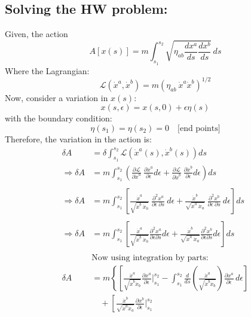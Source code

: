 \documentclass[14pt]{article} %
\begin{document}
\begin{framed}
\vspace{-0.5cm}
\subsection*{Solving the HW problem:}
Given, the action
\[
A[x(s)] = m \int_{s_1}^{s_2} \sqrt{\eta_{ab} \frac{dx^a}{ds} \frac{dx^b}{ds}} \, ds
\]
Where the Lagrangian:
\[
\mathcal{L}(\dot{x}^a, \dot{x}^b) = m\left( \eta_{ab}~\dot{x}^a\dot{x}^b \right)^{1/2}
\]
\noindent
Now, consider a variation in $x(s)$:
\[
x(s,\epsilon) = x(s,0) + \epsilon\eta(s)
\]
with the boundary condition:
\[
\eta(s_1) = \eta(s_2) = 0 \quad \text{[end points]}
\]
Therefore, the variation in the action is:
\begin{align*}
\delta A &= \delta \int_{s_1}^{s_2} \mathcal{L} \left( \dot{x}^a\left( s \right), \dot{x}^b \left(s\right) \right) ds \\
\Rightarrow \delta A &= m \int_{s_1}^{s_2} \left( \frac{\partial \mathcal{L}}{\partial \dot{x}^a}~ \frac{\partial \dot{x}^a}{\partial \epsilon} d\epsilon + \frac{\partial \mathcal{L}}{\partial \dot{x}^b}~\frac{\partial \dot{x}^b}{\partial \epsilon} d\epsilon \right) ds \\
\\
\Rightarrow \delta A &= m \int_{s_1}^{s_2} \left[ 
\frac{\dot{x}^a}{\sqrt{\dot{x}^b~ \dot{x}_b}}~ \frac{\partial^2 {x}^a}{\partial \epsilon~\partial s}~d \epsilon 
+ 
\frac{\dot{x}^b}{\sqrt{\dot{x}^a~\dot{x}_a}}~ \frac{\partial^2{x}^b}{\partial \epsilon~\partial s}~d\epsilon 
\right] ds \\
\\
\Rightarrow \delta A &= m \int_{s_1}^{s_2} \left[ 
\frac{\dot{x}^a}{\sqrt{\dot{x}^b~\dot{x}_b}} \frac{\partial^2{x}^a}{\partial \epsilon \partial s} d \epsilon 
+ 
\frac{\dot{x}^b}{\sqrt{\dot{x}^a~\dot{x}_a}} \frac{\partial^2 {x}^b}{\partial \epsilon \partial s} d \epsilon
\right] ds \\
\\
&\text{Now using integration by parts:} \\
\delta A &= m
\left\{ 
\left[ 
\frac{\dot{x}^a}{\sqrt{\dot{x}^b \dot{x}_b}} \frac{\partial x^a}{\partial \epsilon} \Bigg|_{s_1}^{s_2}
- \int_{s_1}^{s_2} \frac{d}{ds} \left( \frac{\dot{x}^a}{\sqrt{\dot{x}^b \dot{x}_b}} \right) \frac{\partial x^a}{\partial \epsilon} \, d \epsilon
\right] \right. \\
&\quad + \left. \left[ 
\frac{\dot{x}^b}{\sqrt{\dot{x}^a \dot{x}_a}} \frac{\partial x^b}{\partial \epsilon} \Bigg|_{s_1}^{s_2}

\end{align*}
\end{framed}
\end{document}
